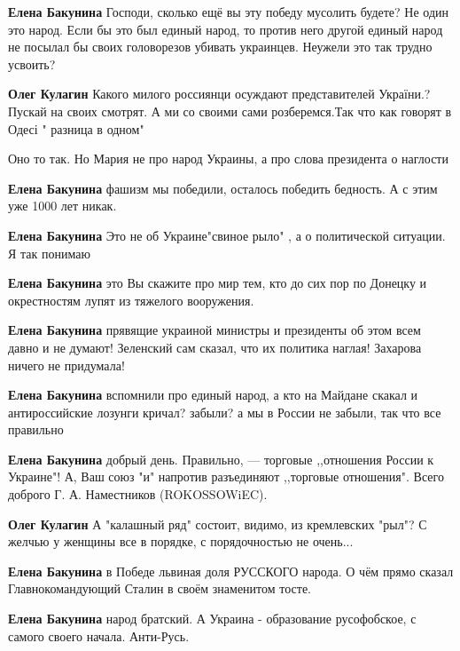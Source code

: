 \begin{itemize}
\begin{itemize}
\textbf{Елена Бакунина} Господи, сколько ещё вы эту победу мусолить будете? Не один это народ. Если бы это был единый народ, то против него другой единый народ не посылал бы своих головорезов убивать украинцев. Неужели это так трудно усвоить?

\textbf{Олег Кулагин} Какого милого россиянци осуждают представителей України.? Пускай на своих смотрят. А ми со своими сами розберемся.Так что как говорят в Одесі " разница в одном"

Оно то так. Но Мария не про народ Украины, а про слова президента о наглости

\textbf{Елена Бакунина} фашизм мы победили, осталось победить бедность. А с этим уже 1000 лет никак.

\textbf{Елена Бакунина} Это не об Украине"свиное рыло" , а о политической ситуации. Я так понимаю

\textbf{Елена Бакунина} это Вы скажите про мир тем, кто до сих пор по Донецку и окрестностям лупят из тяжелого вооружения.

\textbf{Елена Бакунина} прявящие украиной министры и президенты об этом всем давно и не думают! Зеленский сам сказал, что их политика наглая! Захарова ничего не придумала!

\textbf{Елена Бакунина} вспомнили про единый народ, а кто на Майдане скакал и антироссийские лозунги кричал? забыли? а мы в России не забыли, так что все правильно

\textbf{Елена Бакунина} добрый день.
Правильно, — торговые ,,отношения России к Украине"! А, Ваш союз "и" напротив разъединяют ,,торговые отношения".
Всего доброго Г. А. Наместников (ROKOSSOWiEC).

\textbf{Олег Кулагин} А "калашный ряд" состоит, видимо, из кремлевских "рыл"? С желчью у женщины все в порядке, с порядочностью не очень...

\textbf{Елена Бакунина} в Победе львиная доля РУССКОГО народа. О чём прямо сказал Главнокомандующий Сталин в своём знаменитом тосте.

\textbf{Елена Бакунина} народ братский. А Украина - образование русофобское, с самого своего начала. Анти-Русь.

\end{itemize} %


\end{itemize}
